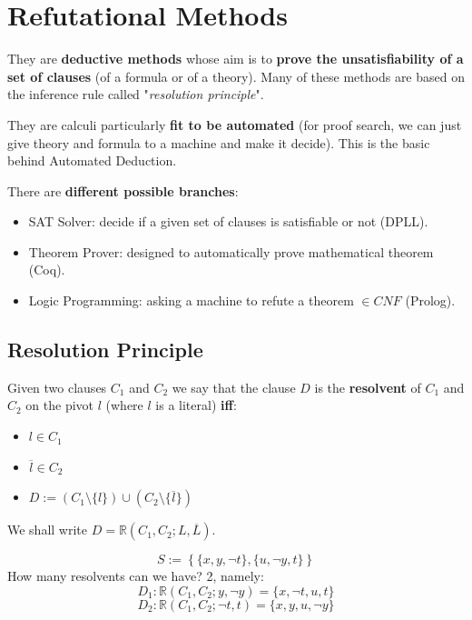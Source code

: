 
\chapter{Refutational Methods}

They are \textbf{deductive methods} whose aim is to \textbf{prove the unsatisfiability of a set of clauses} (of a formula or of a theory). Many of these methods are based on the inference rule called "\textit{resolution principle}".

They are calculi particularly \textbf{fit to be automated} (for proof search, we can just give theory and formula to a machine and make it decide). This is the basic behind Automated Deduction.

\noindent
There are \textbf{different possible branches}:
\begin{itemize}
	\item SAT Solver: decide if a given set of clauses is satisfiable or not (DPLL). \\

	\item Theorem Prover: designed to automatically prove mathematical theorem (Coq).  \\

	\item Logic Programming: asking a machine to refute a theorem $\in CNF$ (Prolog).
\end{itemize}

\section{Resolution Principle}
Given two clauses $C_1$ and $C_2$ we say that the clause $D$ is the \textbf{resolvent} of $C_1$ and $C_2$ on the pivot $l$ (where $l$ is a literal) \textbf{iff}:
\begin{itemize}
	\item $l \in C_1$
	\item $\overline l \in C_2$
	\item $D:= (C_1 \setminus \{l\}) \cup (C_2 \setminus \{\overline l\})$
\end{itemize}

\noindent
We shall write $D = \mathbb{R} (C_1, C_2; L, \overline L)$.\\

\begin{example}
$$ S := \left\{\{x,y,\neg t\}, \{u, \neg y, t\}\right\} $$
How many resolvents can we have? 2, namely:
$$ D_1: \mathbb{R} (C_1, C_2; y, \neg y) = \{x, \neg t, u, t\} $$
$$ D_2: \mathbb{R} (C_1, C_2; \neg t, t) = \{x,y,u, \neg y\} $$
\end{example}

